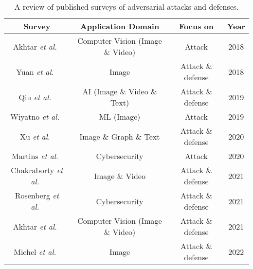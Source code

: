 \documentclass{ieeeaccess}
\def\etal{\textit{et al.}}
\begin{document}
\begin{table*}
\begin{center}
\caption{A review of published surveys of adversarial attacks and defenses.}
\label{surveys} 
    \centering
    
    \begin{tabular}{ c  c  c  c }
    \toprule
    
    \bf Survey  &\bf Application Domain  &\bf Focus on &\bf Year  \\
    \midrule

    
    Akhtar \etal~\cite{akhtar2018threat} & Computer Vision (Image \& Video) & Attack & 2018  \\
    
    Yuan \etal~\cite{yuan2019adversarial} & Image & Attack \& defense &  2018 \\

    Qiu \etal~\cite{qiu2019review} & AI (Image \& Video \& Text) & Attack \& defense & 2019\\

    Wiyatno \etal~\cite{wiyatno2019adversarial} & ML (Image) & Attack & 2019\\

    Xu \etal~\cite{xu2020adversarial} & Image \& Graph \& Text & Attack \& defense & 2020 \\
    
    Martins \etal~\cite{martins2020adversarial} & Cybersecurity & Attack & 2020\\
        
    Chakraborty \etal~\cite{chakraborty2021survey} & Image \& Video & Attack \& defense & 2021 \\
    
    Rosenberg \etal~\cite{rosenberg2021adversarial} & Cybersecurity & Attack \& defense & 2021 \\    
    
    Akhtar \etal~\cite{akhtar2021advances} & Computer Vision (Image \& Video) & Attack \& defense  & 2021 \\
    
    Michel \etal~\cite{michel2022survey} & Image & Attack \& defense & 2022 \\
    

\end{tabular}
\end{center}
\end{table*}
\end{document}
